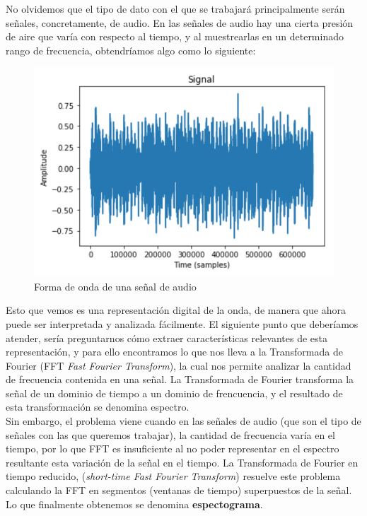 \documentclass[11pt,a4paper,spanish]{book}
\begin{document}
	No olvidemos que el tipo de dato con el que se trabajará principalmente serán señales, concretamente, de audio. En las señales de audio hay una cierta presión de aire que varía con respecto al tiempo, y al muestrearlas en un determinado rango de frecuencia, obtendríamos algo como lo siguiente:
	
	\begin{figure}[H]
		\centering
		\includegraphics[scale=0.3]{waveform.png}
		\caption{Forma de onda de una señal de audio}
	\end{figure}
	
	Esto que vemos es una representación digital de la onda, de manera que ahora puede ser interpretada y analizada fácilmente.\hfill \break
	El siguiente punto que deberíamos atender, sería preguntarnos cómo extraer características relevantes de esta representación, y para ello encontramos lo que nos lleva a la Transformada de Fourier (FFT \emph{Fast Fourier Transform}), la cual nos permite analizar la cantidad de frecuencia contenida en una señal. La Transformada de Fourier transforma la señal de un dominio de tiempo a un dominio de frencuencia, y el resultado de esta transformación se denomina espectro. \\
	Sin embargo, el problema viene cuando en las señales de audio (que son el tipo de señales con las que queremos trabajar), la cantidad de frecuencia varía en el tiempo, por lo que FFT es insuficiente al no poder representar en el espectro resultante esta variación de la señal en el tiempo. La Transformada de Fourier en tiempo reducido, (\emph{short-time Fast Fourier Transform}) resuelve este problema calculando la FFT en segmentos (ventanas de tiempo) superpuestos de la señal. Lo que finalmente obtenemos se denomina \textbf{espectograma}.
	
\end{document}
